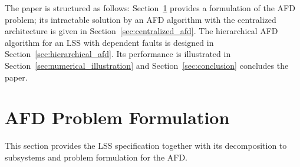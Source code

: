 \documentclass[conference,10pt]{IEEEtran}
\begin{document}
The paper is structured as follows: 
Section~\ref{sec:afd_problem_formulation} provides a formulation of the AFD problem; its intractable solution by an AFD algorithm with the centralized architecture is given in Section~\ref{sec:centralized_afd}.
The hierarchical AFD algorithm for an LSS with dependent faults is designed in Section~\ref{sec:hierarchical_afd}.
Its performance is illustrated in Section~\ref{sec:numerical_illustration} and Section~\ref{sec:conclusion} concludes the paper.
\section{AFD Problem Formulation}\label{sec:afd_problem_formulation}
This section provides the LSS specification together with its decomposition to subsystems and problem formulation for the AFD\@.
\end{document}

